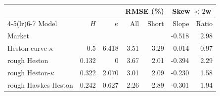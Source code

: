 \begin{tabular}{lrrrrrr}
\toprule
 & & & \multicolumn{2}{c}{RMSE (\%)} & \multicolumn{2}{c}{Skew $<2$w}\\
\cmidrule(lr){4-5}\cmidrule(lr){6-7}
Model & $H$ & $\kappa$ & All & Short & Slope & Ratio\\
\midrule
Market & & & & & -0.518 & 2.98\\
\addlinespace
Heston-curve-$\kappa$ & 0.5 & 6.418 & 3.51 & 3.29 & -0.014 & 0.97\\
rough Heston & 0.132 & 0 & 3.67 & 2.01 & -0.394 & 2.29\\
rough Heston-$\kappa$ & 0.322 & 2.070 & 3.01 & 2.09 & -0.230 & 1.58\\
rough Hawkes Heston & 0.242 & 0.627 & 2.26 & 2.89 & -0.301 & 1.94\\
\bottomrule
\end{tabular}
